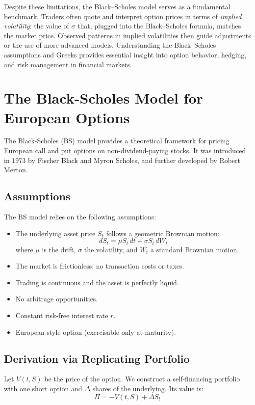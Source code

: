 Despite these limitations, the Black--Scholes model serves as a fundamental benchmark. Traders often quote and interpret option prices in terms of \emph{implied volatility}: the value of \(\sigma\) that, plugged into the Black--Scholes formula, matches the market price. Observed patterns in implied volatilities then guide adjustments or the use of more advanced models.  Understanding the Black--Scholes assumptions and Greeks provides essential insight into option behavior, hedging, and risk management in financial markets.












\section{The Black-Scholes Model for European Options}

The Black-Scholes (BS) model provides a theoretical framework for pricing European call and put options on non-dividend-paying stocks. It was introduced in 1973 by Fischer Black and Myron Scholes, and further developed by Robert Merton.

\subsection*{Assumptions}
The BS model relies on the following assumptions:
\begin{itemize}
  \item The underlying asset price $S_t$ follows a geometric Brownian motion:
  \[
  dS_t = \mu S_t\,dt + \sigma S_t\,dW_t
  \]
  where $\mu$ is the drift, $\sigma$ the volatility, and $W_t$ a standard Brownian motion.
  \item The market is frictionless: no transaction costs or taxes.
  \item Trading is continuous and the asset is perfectly liquid.
  \item No arbitrage opportunities.
  \item Constant risk-free interest rate $r$.
  \item European-style option (exercisable only at maturity).
\end{itemize}

\subsection*{Derivation via Replicating Portfolio}
Let $V(t, S)$ be the price of the option. We construct a self-financing portfolio with one short option and $\Delta$ shares of the underlying. Its value is:
\[
\Pi = -V(t, S) + \Delta S_t
\]

